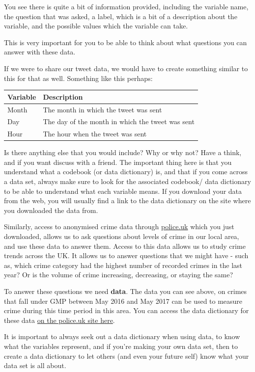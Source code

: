 \documentclass[]{book}
\theoremstyle{definition}
\theoremstyle{definition}
\theoremstyle{definition}
\theoremstyle{remark}
\begin{document}
You see there is quite a bit of information provided, including the
variable name, the question that was asked, a label, which is a bit of a
description about the variable, and the possible values which the
variable can take.

This is very important for you to be able to think about what questions
you can answer with these data.

If we were to share our tweet data, we would have to create something
similar to this for that as well. Something like this perhaps:

\begin{tabular}{l|l}
\hline
Variable & Description\\
\hline
Month & The month in which the tweet was sent\\
\hline
Day & The day of the month in which the tweet was sent\\
\hline
Hour & The hour when the tweet was sent\\
\hline
\end{tabular}

Is there anything else that you would include? Why or why not? Have a
think, and if you want discuss with a friend. The important thing here
is that you understand what a codebook (or data dictionary) is, and that
if you come across a data set, always make sure to look for the
associated codebook/ data dictionary to be able to understand what each
variable means. If you download your data from the web, you will usually
find a link to the data dictionary on the site where you downloaded the
data from.

Similarly, access to anonymised crime data through
\href{www.police.uk}{police.uk} which you just downloaded, allows us to
ask questions about levels of crime in our local area, and use these
data to answer them. Access to this data allows us to study crime trends
across the UK. It allows us to answer questions that we might have -
such as, which crime category had the highest number of recorded crimes
in the last year? Or is the volume of crime increasing, decreasing, or
staying the same?

To answer these questions we need \textbf{data}. The data you can see
above, on crimes that fall under GMP between May 2016 and May 2017 can
be used to measure crime during this time period in this area. You can
access the data dictionary for these data
\href{https://data.police.uk/about/\#columns}{on the police.uk site
here}.

It is important to always seek out a data dictionary when using data, to
know what the variables represent, and if you're making your own data
set, then to create a data dictionary to let others (and even your
future self) know what your data set is all about.
\end{document}
